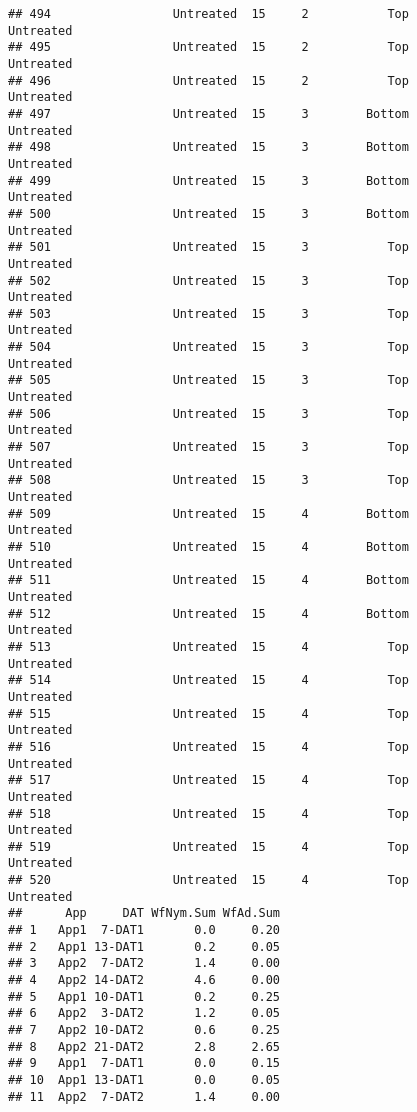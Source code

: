 \documentclass[
]{article}
\begin{document}
\begin{verbatim}
## 494                 Untreated  15     2           Top              Untreated
## 495                 Untreated  15     2           Top              Untreated
## 496                 Untreated  15     2           Top              Untreated
## 497                 Untreated  15     3        Bottom              Untreated
## 498                 Untreated  15     3        Bottom              Untreated
## 499                 Untreated  15     3        Bottom              Untreated
## 500                 Untreated  15     3        Bottom              Untreated
## 501                 Untreated  15     3           Top              Untreated
## 502                 Untreated  15     3           Top              Untreated
## 503                 Untreated  15     3           Top              Untreated
## 504                 Untreated  15     3           Top              Untreated
## 505                 Untreated  15     3           Top              Untreated
## 506                 Untreated  15     3           Top              Untreated
## 507                 Untreated  15     3           Top              Untreated
## 508                 Untreated  15     3           Top              Untreated
## 509                 Untreated  15     4        Bottom              Untreated
## 510                 Untreated  15     4        Bottom              Untreated
## 511                 Untreated  15     4        Bottom              Untreated
## 512                 Untreated  15     4        Bottom              Untreated
## 513                 Untreated  15     4           Top              Untreated
## 514                 Untreated  15     4           Top              Untreated
## 515                 Untreated  15     4           Top              Untreated
## 516                 Untreated  15     4           Top              Untreated
## 517                 Untreated  15     4           Top              Untreated
## 518                 Untreated  15     4           Top              Untreated
## 519                 Untreated  15     4           Top              Untreated
## 520                 Untreated  15     4           Top              Untreated
##      App     DAT WfNym.Sum WfAd.Sum
## 1   App1  7-DAT1       0.0     0.20
## 2   App1 13-DAT1       0.2     0.05
## 3   App2  7-DAT2       1.4     0.00
## 4   App2 14-DAT2       4.6     0.00
## 5   App1 10-DAT1       0.2     0.25
## 6   App2  3-DAT2       1.2     0.05
## 7   App2 10-DAT2       0.6     0.25
## 8   App2 21-DAT2       2.8     2.65
## 9   App1  7-DAT1       0.0     0.15
## 10  App1 13-DAT1       0.0     0.05
## 11  App2  7-DAT2       1.4     0.00

\end{verbatim}
\end{document}

